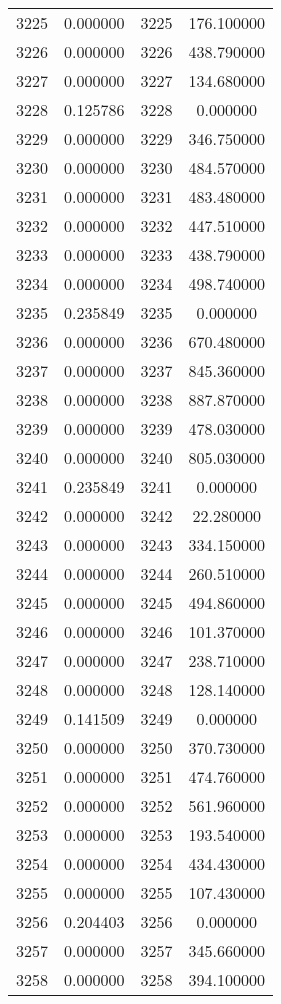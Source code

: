 \documentclass[12pt]{article}
\begin{document}
\begin{longtable}{@{}cccc@{}}
3225 & 0.000000 & 3225 & 176.100000 \\
3226 & 0.000000 & 3226 & 438.790000 \\
3227 & 0.000000 & 3227 & 134.680000 \\
3228 & 0.125786 & 3228 & 0.000000 \\
3229 & 0.000000 & 3229 & 346.750000 \\
3230 & 0.000000 & 3230 & 484.570000 \\
3231 & 0.000000 & 3231 & 483.480000 \\
3232 & 0.000000 & 3232 & 447.510000 \\
3233 & 0.000000 & 3233 & 438.790000 \\
3234 & 0.000000 & 3234 & 498.740000 \\
3235 & 0.235849 & 3235 & 0.000000 \\
3236 & 0.000000 & 3236 & 670.480000 \\
3237 & 0.000000 & 3237 & 845.360000 \\
3238 & 0.000000 & 3238 & 887.870000 \\
3239 & 0.000000 & 3239 & 478.030000 \\
3240 & 0.000000 & 3240 & 805.030000 \\
3241 & 0.235849 & 3241 & 0.000000 \\
3242 & 0.000000 & 3242 & 22.280000 \\
3243 & 0.000000 & 3243 & 334.150000 \\
3244 & 0.000000 & 3244 & 260.510000 \\
3245 & 0.000000 & 3245 & 494.860000 \\
3246 & 0.000000 & 3246 & 101.370000 \\
3247 & 0.000000 & 3247 & 238.710000 \\
3248 & 0.000000 & 3248 & 128.140000 \\
3249 & 0.141509 & 3249 & 0.000000 \\
3250 & 0.000000 & 3250 & 370.730000 \\
3251 & 0.000000 & 3251 & 474.760000 \\
3252 & 0.000000 & 3252 & 561.960000 \\
3253 & 0.000000 & 3253 & 193.540000 \\
3254 & 0.000000 & 3254 & 434.430000 \\
3255 & 0.000000 & 3255 & 107.430000 \\
3256 & 0.204403 & 3256 & 0.000000 \\
3257 & 0.000000 & 3257 & 345.660000 \\
3258 & 0.000000 & 3258 & 394.100000 \\

\end{longtable}
\end{document}
